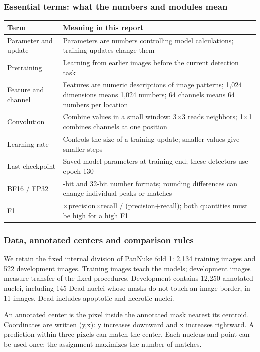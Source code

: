 \documentclass[
  12pt,
]{article}
\newcounter{none} %
\begin{document}
\subsubsection{Essential terms: what the numbers and modules mean}\label{chapter3}
{\def\LTcaptype{none}
\begin{longtable}[]{@{}
  >{\raggedright\arraybackslash}p{}
  >{\raggedright\arraybackslash}p{}@{}}
\toprule\noalign{}
Term & Meaning in this report\\
\midrule\noalign{}
\endhead
\bottomrule\noalign{}
\endlastfoot
Parameter and update & Parameters are numbers controlling model calculations; training updates change them\\
Pretraining & Learning from earlier images before the current detection task\\
Feature and channel & Features are numeric descriptions of image patterns; 1,024 dimensions means 1,024 numbers; 64 channels means 64 numbers per location\\
Convolution & Combine values in a small window: 3×3 reads neighbors; 1×1 combines channels at one position\\
Learning rate & Controls the size of a training update; smaller values give smaller steps\\
Last checkpoint & Saved model parameters at training end; these detectors use epoch 130\\
BF16 / FP32 & 16-bit and 32-bit number formats; rounding differences can change individual peaks or matches\\
F1 & 2×precision×recall / (precision+recall); both quantities must be high for a high F1\\
\end{longtable}}
\subsubsection{Data, annotated centers and comparison rules}\label{chapter4}
We retain the fixed internal division of PanNuke fold 1: 2,134 training images and 522 development images. Training images teach the models; development images measure transfer of the fixed procedures. Development contains 12,250 annotated nuclei, including 145 Dead nuclei whose masks do not touch an image border, in 11 images. Dead includes apoptotic and necrotic nuclei.

An annotated center is the pixel inside the annotated mask nearest its centroid. Coordinates are written (y,x): y increases downward and x increases rightward. A prediction within three pixels can match the center. Each nucleus and point can be used once; the assignment maximizes the number of matches.
\end{document}
